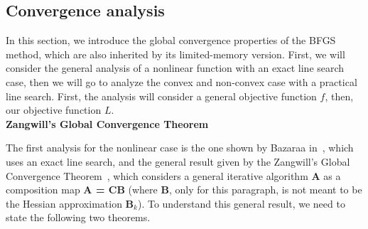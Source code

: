 \documentclass[11pt]{article}
\begin{document}

\subsection{Convergence analysis}\label{convergence_qn}
In this section, we introduce the global convergence properties of the BFGS method, which are also inherited by its limited-memory version. First, we will consider the general analysis of a nonlinear function with an exact line search case, then we will go to analyze the convex and non-convex case with a practical line search. First, the analysis will consider a general objective function $f$, then, our objective function $L$.\\

\textbf{Zangwill’s Global Convergence Theorem}

The first analysis for the nonlinear case is the one shown by Bazaraa in~\cite{Bazaraa_nonlinear}, which uses an exact line search, and the general result given by the Zangwill’s Global Convergence Theorem~\cite{Zangwill_nonlinear}, which considers a general iterative algorithm \textbf{A} as a composition map \textbf{A = CB} (where \textbf{B}, only for this paragraph, is not meant to be the Hessian approximation $\mathbf{B}_k$). To understand this general result, we need to state the following two theorems.
\end{document}
